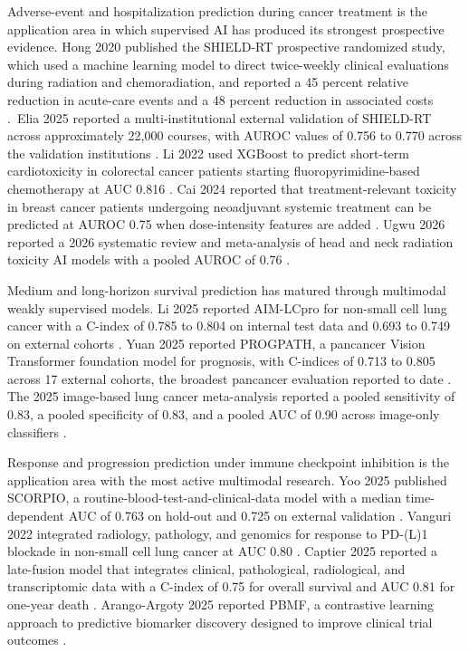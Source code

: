 \documentclass[11pt]{article}
\begin{document}
Adverse-event and hospitalization prediction during cancer treatment
is the application area in which supervised AI has produced its
strongest prospective evidence. Hong 2020 published the SHIELD-RT
prospective randomized study, which used a machine learning model to
direct twice-weekly clinical evaluations during radiation and
chemoradiation, and reported a 45 percent relative reduction in
acute-care events and a 48 percent reduction in associated costs
\cite{Hong2020SHIELDRT}.\ Elia 2025 reported a multi-institutional
external validation of SHIELD-RT across approximately 22,000 courses,
with AUROC values of 0.756 to 0.770 across the validation institutions
\cite{Elia2025SHIELDRTExternalValidation}. Li 2022 used XGBoost to
predict short-term cardiotoxicity in colorectal cancer patients
starting fluoropyrimidine-based chemotherapy at AUC 0.816
\cite{Li2022FluoropyrimidineCardiotoxicity}. Cai 2024 reported that
treatment-relevant toxicity in breast cancer patients undergoing
neoadjuvant systemic treatment can be predicted at AUROC 0.75 when
dose-intensity features are added \cite{Cai2024BreastCancerToxicityPrediction}.
Ugwu 2026 reported a 2026 systematic review and meta-analysis of head
and neck radiation toxicity AI models with a pooled AUROC of 0.76
\cite{Ugwu2026HeadNeckRadiationToxicityMeta}.

Medium and long-horizon survival prediction has matured through
multimodal weakly supervised models. Li 2025 reported AIM-LCpro for
non-small cell lung cancer with a C-index of 0.785 to 0.804 on internal
test data and 0.693 to 0.749 on external cohorts
\cite{Li2025AIMLCpro}. Yuan 2025 reported PROGPATH, a pancancer Vision
Transformer foundation model for prognosis, with C-indices of 0.713 to
0.805 across 17 external cohorts, the broadest pancancer evaluation
reported to date \cite{Yuan2025PROGPATH}. The 2025 image-based lung
cancer meta-analysis reported a pooled sensitivity of 0.83, a pooled
specificity of 0.83, and a pooled AUC of 0.90 across image-only
classifiers \cite{Yuan2025LungImageMeta}.

Response and progression prediction under immune checkpoint inhibition
is the application area with the most active multimodal research.
Yoo 2025 published SCORPIO, a routine-blood-test-and-clinical-data model
with a median time-dependent AUC of 0.763 on hold-out and 0.725 on
external validation \cite{Yoo2025SCORPIO}. Vanguri 2022 integrated
radiology, pathology, and genomics for response to PD-(L)1 blockade in
non-small cell lung cancer at AUC 0.80
\cite{Vanguri2022MultimodalPDL1NSCLC}. Captier 2025 reported a
late-fusion model that integrates clinical, pathological, radiological,
and transcriptomic data with a C-index of 0.75 for overall survival
and AUC 0.81 for one-year death \cite{Captier2025MultimodalNSCLCImmunotherapy}.
Arango-Argoty 2025 reported PBMF, a contrastive learning approach to
predictive biomarker discovery designed to improve clinical trial
outcomes \cite{ArangoArgoty2025PBMF}. 
\end{document}
